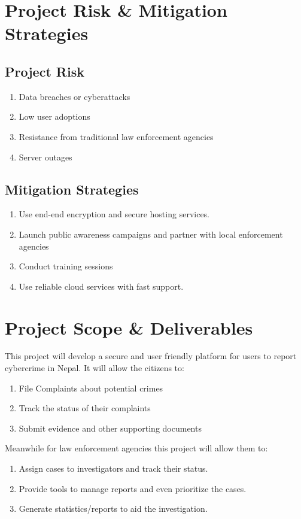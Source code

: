 \documentclass[11pt]{article}
\begin{document}
\section{Project Risk \& Mitigation Strategies}
\label{sec:org41de46d}
\subsection{Project Risk}
\label{sec:org2303160}
\begin{enumerate}
\item Data breaches or cyberattacks
\item Low user adoptions
\item Resistance from traditional law enforcement agencies
\item Server outages
\end{enumerate}
\subsection{Mitigation Strategies}
\label{sec:orgee9c4a1}
\begin{enumerate}
\item Use end-end encryption and  secure hosting services.
\item Launch public awareness campaigns and partner with local enforcement agencies
\item Conduct training sessions
\item Use reliable cloud services with fast support.
\end{enumerate}
\section{Project Scope \& Deliverables}
\label{sec:org2db1a4d}
This project will develop a secure and user friendly platform for users to report cybercrime in Nepal. It will allow the citizens to:
\begin{enumerate}
\item File Complaints about potential crimes
\item Track the status of their complaints
\item Submit evidence and other supporting documents
\end{enumerate}

Meanwhile for law enforcement agencies this project will allow them to:
\begin{enumerate}
\item Assign cases to investigators and track their status.
\item Provide tools to manage reports and even prioritize the cases.
\item Generate statistics/reports to aid the investigation.
\end{enumerate}
\end{document}
